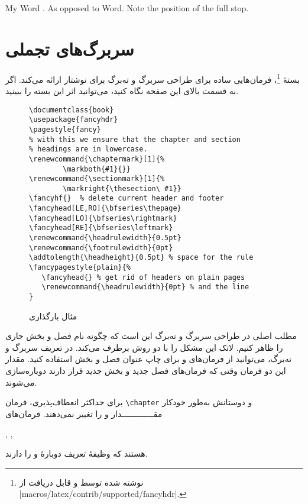 {\begin{example}
My Word . As opposed
to Word. Note the
position of the full stop.
\end{example}

\section{سربرگ‌های تجملی}\label{sec:fancy}

بستهٔ 
 \footnote{نوشته شده توسط  و قابل دریافت از 
  \CTANref|macros/latex/contrib/supported/fancyhdr|.}،
 فرمان‌هایی ساده برای طراحی سربرگ و ته‌برگ برای نوشتار‌ ارائه می‌کند. اگر به قسمت بالای این صفحه نگاه کنید، می‌توانید اثر این بسته را ببینید.


\begin{figure}[!htbp]
\setLR
\begin{lined}{\textwidth}
\begin{verbatim}
\documentclass{book}
\usepackage{fancyhdr}
\pagestyle{fancy}
% with this we ensure that the chapter and section
% headings are in lowercase.
\renewcommand{\chaptermark}[1]{%
        \markboth{#1}{}}
\renewcommand{\sectionmark}[1]{%
        \markright{\thesection\ #1}}
\fancyhf{}  % delete current header and footer
\fancyhead[LE,RO]{\bfseries\thepage}
\fancyhead[LO]{\bfseries\rightmark}
\fancyhead[RE]{\bfseries\leftmark}
\renewcommand{\headrulewidth}{0.5pt}
\renewcommand{\footrulewidth}{0pt}
\addtolength{\headheight}{0.5pt} % space for the rule
\fancypagestyle{plain}{%
   \fancyhead{} % get rid of headers on plain pages
   \renewcommand{\headrulewidth}{0pt} % and the line
}
\end{verbatim}
\end{lined}
\setRL
\caption{مثال بارگذاری } \label{fancyhdr}
\end{figure}


مطلب اصلی در طراحی سربرگ و ته‌برگ این است که چگونه نام فصل و بخش جاری را ظاهر کنیم. لاتک این مشکل را با دو روش برطرف می‌کند. در تعریف سربرگ و ته‌برگ، می‌توانید از فرمان‌های   و  برای چاپ عنوان فصل و بخش استفاده کنید. مقدار این دو فرمان وقتی که فرمان‌های فصل جدید و بخش جدید قرار دارند دوباره‌سازی می‌شوند.

برای حداکثر انعطاف‌پذیری، فرمان \verb|\chapter| و دوستانش به‌طور خودکار مقـــــــــــــدار  و  را تغییر نمی‌دهند. فرمان‌های  
\begin{latin}
, ,  
\end{latin}
 هستند که وظیفهٔ تعریف دوبارهٔ 
و  را دارند.

}
